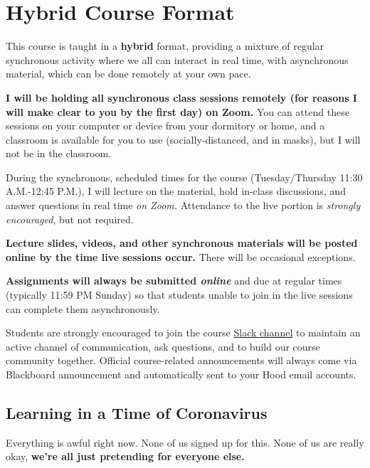 \documentclass{article}
\begin{document}
\hypertarget{hybrid-course-format}{%
\section*{Hybrid Course Format}\label{hybrid-course-format}}

This course is taught in a \textbf{hybrid} format, providing a mixture
of regular synchronous activity where we all can interact in real time,
with asynchronous material, which can be done remotely at your own pace.

\textbf{I will be holding all synchronous class sessions remotely (for
reasons I will make clear to you by the first day) on Zoom.} You can
attend these sessions on your computer or device from your dormitory or
home, and a classroom is available for you to use (socially-distanced,
and in masks), but I will not be in the classroom.

During the synchronous, scheduled times for the course (Tuesday/Thursday
11:30 A.M.-12:45 P.M.), I will lecture on the material, hold in-class
discussions, and answer questions in real time \emph{on Zoom.}
Attendance to the live portion is \emph{strongly encouraged}, but not
required.

\textbf{Lecture slides, videos, and other synchronous materials will be
posted online by the time live sessions occur.} There will be occasional
exceptions.

\textbf{Assignments will always be submitted \emph{online}} and due at
regular times (typically 11:59 PM Sunday) so that students unable to
join in the live sessions can complete them asynchronously.

Students are strongly encouraged to join the course
\href{https://hoodcollegeeconomics.slack.com}{Slack channel} to maintain
an active channel of communication, ask questions, and to build our
course community together. Official course-related announcements will
always come via Blackboard announcement and automatically sent to your
Hood email accounts.

\hypertarget{learning-in-a-time-of-coronavirus}{%
\subsection*{Learning in a Time of
Coronavirus}\label{learning-in-a-time-of-coronavirus}}

Everything is awful right now. None of us signed up for this. None of us
are really okay, \textbf{we're all just pretending for everyone else.}
\end{document}
